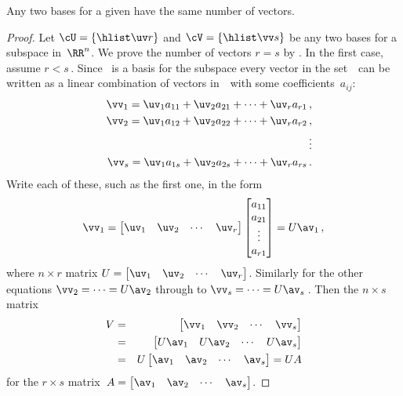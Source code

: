 \begin{theorem} \label{thm:sameDii} 
Any two bases for a given  have the same number of vectors.
\end{theorem}
\begin{proof} 
Let \(\cU=\{\hlist\uv r\}\) and \(\cV=\{\hlist\vv s\}\) be any two  bases for a subspace in~\(\RR^n\).
We prove the number of vectors \(r=s\) by .
In the first case, assume \(r<s\)\,.
Since \cU\ is a basis for the subspace every vector in the set~\cV\ can be written as a linear combination of vectors in~\cU\ with some coefficients~\(a_{ij}\):
\begin{eqnarray*}
  &&\vv_1=\uv_1a_{11}+\uv_2a_{21}+\cdots+\uv_ra_{r1}\,,
\\&&\vv_2=\uv_1a_{12}+\uv_2a_{22}+\cdots+\uv_ra_{r2}\,,
\\&&\quad\vdots
\\&&\vv_s=\uv_1a_{1s}+\uv_2a_{2s}+\cdots+\uv_ra_{rs}\,.
\end{eqnarray*}
Write each of these, such as the first one, in the form
\begin{equation*}
\vv_1=\begin{bmatrix} \uv_1&\uv_2&\cdots&\uv_r \end{bmatrix}
\begin{bmatrix} a_{11}\\a_{21}\\\vdots\\a_{r1} \end{bmatrix}
=U\av_1\,,
\end{equation*}
where \(n\times r\) matrix \(U=\begin{bmatrix} \uv_1&\uv_2&\cdots&\uv_r \end{bmatrix}\).
Similarly for the other equations \(\vv_2=\cdots=U\av_2\) through to \(\vv_s=\cdots=U\av_s\)\,.
Then the \(n\times s\) matrix
\begin{eqnarray*}
V&=&\begin{bmatrix} \vv_1&\vv_2&\cdots&\vv_s \end{bmatrix}
\\&=&\begin{bmatrix} U\av_1& U\av_2&\cdots&U\av_s\end{bmatrix}
\\&=&U\begin{bmatrix} \av_1& \av_2&\cdots&\av_s\end{bmatrix}
=UA
\end{eqnarray*}
for the \(r\times s\) matrix~\(A=\begin{bmatrix} \av_1& \av_2&\cdots&\av_s \end{bmatrix}\).

\end{proof}
